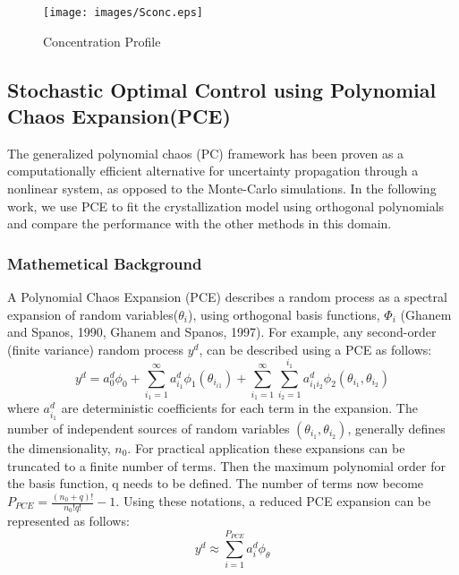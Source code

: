 \documentclass[3p,times,authoryear]{elsarticle}
\begin{document}
\begin{figure}[h!] 

\begin{center}
\texttt{[image: images/Sconc.eps]}
\end{center}
\caption{Concentration Profile}
\end{figure}


\subsection{Stochastic Optimal Control using Polynomial Chaos Expansion(PCE)}

The generalized polynomial chaos (PC) framework has been proven as a computationally efficient alternative for uncertainty propagation through a  nonlinear system, as opposed to the Monte-Carlo simulations. In the following work, we use PCE to fit the crystallization model using orthogonal polynomials and compare the performance with the other methods in this domain. 

\subsubsection{Mathemetical Background}
A Polynomial Chaos Expansion (PCE) describes a random process as a spectral expansion of random variables($\theta_{i}$), using orthogonal basis functions, $\Phi_{i}$ (Ghanem and Spanos, 1990\cite{ghanem}, Ghanem and Spanos, 1997\cite{ghanem1997}). For example, any second-order (finite variance) random process $y^{d}$, can be described using a PCE as follows:
\begin{equation}
y^{d} = a_{0}^{d}\phi_{0} + \sum_{i_{1}=1}^{\infty} a_{i_{1}}^{d}\phi_{1}(\theta_{i_{i1}}) + \sum_{i_{1}=1}^{\infty}\sum_{i_{2}=1}^{i_{1}} a_{i_{1}i_{2}}^d\phi_{2}(\theta_{i_{1}},\theta_{i_{2}})
\end{equation}
where $a_{i_{1}}^d$  are deterministic coefficients for each term in the expansion. The number of independent sources of random variables $(\theta_{i_{1}}, \theta_{i_{2}})$, generally defines the dimensionality, $n_{0}$. For practical application these expansions can be truncated to a finite number of terms. Then the maximum polynomial order for the basis function, q needs to be defined. The number of terms now become $P_{PCE} = \frac{(n_{0}+q)!}{n_{0}!q!} -1 $. Using these notations, a reduced PCE expansion can be represented as follows:
\begin{equation} 
\label{poly}
y^{d} \approx \sum_{i=1}^{P_{PCE}} a_{i}^{d}\phi_{\theta}
\end{equation}
\end{document}
